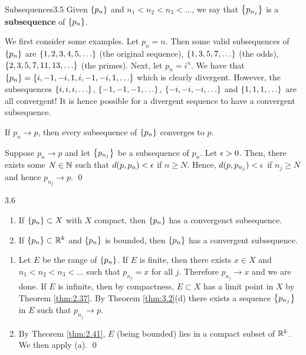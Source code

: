 \setcounter{rudin}{4}
\begin{definition}{Subsequences}{3.5}
    Given $\set{p_n}$ and $n_1 < n_2 < n_3 < \ldots$, we say that $\set{p_{n_j}}$ is a \textbf{subsequence} of $\set{p_n}$.
\end{definition}

\noindent We first consider some examples. Let $p_n = n$. Then some valid subsequences of $\set{p_n}$ are $\set{1, 2, 3, 4, 5, \ldots}$ (the original sequence), $\set{1, 3, 5, 7, \ldots}$ (the odds), $\set{2, 3, 5, 7, 11, 13, \ldots}$ (the primes). Next, let $p_n = i^n$. We have that $\set{p_n} = \set{i, -1, -i, 1, i, -1, -i, 1, \ldots}$ which is clearly divergent. However, the subsequences $\set{i, i, i, \ldots}$, $\set{-1, -1, -1, \ldots}$, $\set{-i, -i, -i, \ldots}$ and $\set{1, 1, 1, \ldots}$ are all convergent! It is hence possible for a divergent sequence to have a convergent subsequence.

\begin{nlemma}{}{}
    If $p_n \rightarrow p$, then every subsequence of $\set{p_n}$ converges to $p$. 
\end{nlemma}

\begin{nproof}
    Suppose $p_n \rightarrow p$ and let $\set{p_{n_j}}$ be a subsequence of $p_n$. Let $\epsilon > 0$. Then, there exists some $N \in \mathbb{N}$ such that $d(p, p_n) < \epsilon$ if $n \geq N$. Hence, $d(p, p_{n_j}) < \epsilon$ if $n_j \geq N$ and hence $p_{n_j} \rightarrow p$. \qed
\end{nproof}

\begin{theorem}{}{3.6}
    \begin{enumerate}
        \item If $\set{p_n} \subset X$ with $X$ compact, then $\set{p_n}$ has a convergenct subsequence.
        \item If $\set{p_n} \subset \mathbb{R}^k$ and $\set{p_n}$ is bounded, then $\set{p_n}$ has a convergent subsequence.
    \end{enumerate}
\end{theorem}
\begin{nproof}
    \begin{enumerate}
        \item Let $E$ be the range of $\set{p_n}$. If $E$ is finite, then there exists $x \in X$ and $n_1 < n_2 < n_3 < \ldots$ such that $p_{n_j} = x$ for all $j$. Therefore $p_{n_j} \rightarrow x$ and we are done. If $E$ is infinite, then by compactness, $E \subset X$ has a limit point in $X$ by Theorem \ref{thm:2.37}. By Theorem \ref{thm:3.2}(d) there exists a sequence $\set{p_{n_j}}$ in $E$ such that $p_{n_j} \rightarrow p$.
        \item By Theorem \ref{thm:2.41}, $E$ (being bounded) lies in a compact subset of $\mathbb{R}^k$. We then apply (a). \qed
    \end{enumerate}
\end{nproof}

